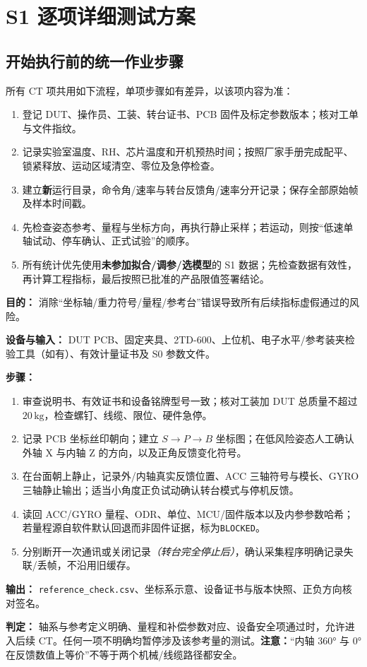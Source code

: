 \section{S1 逐项详细测试方案}
\subsection{开始执行前的统一作业步骤}
所有 CT 项共用如下流程，单项步骤如有差异，以该项内容为准：
\begin{enumerate}
\item 登记 DUT、操作员、工装、转台证书、PCB 固件及标定参数版本；核对工单与文件指纹。
\item 记录实验室温度、RH、芯片温度和开机预热时间；按照厂家手册完成配平、锁紧释放、运动区域清空、零位及急停检查。
\item 建立\textbf{新}运行目录，命令角/速率与转台反馈角/速率分开记录；保存全部原始帧及样本时间戳。
\item 先检查姿态参考、量程与坐标方向，再执行静止采样；若运动，则按“低速单轴试动、停车确认、正式试验”的顺序。
\item 所有统计优先使用\textbf{未参加拟合/调参/选模型}的 S1 数据；先检查数据有效性，再计算工程指标，最后按照已批准的产品限值签署结论。
\end{enumerate}

\textbf{目的：} 消除“坐标轴/重力符号/量程/参考台”错误导致所有后续指标虚假通过的风险。
\par\textbf{设备与输入：} DUT PCB、固定夹具、2TD-600、上位机、电子水平/参考装夹检验工具（如有）、有效计量证书及 S0 参数文件。
\par\textbf{步骤：}
\begin{enumerate}
\item 审查说明书、有效证书和设备铭牌型号一致；核对工装加 DUT 总质量不超过 $20\,\mathrm{kg}$，检查螺钉、线缆、限位、硬件急停。
\item 记录 PCB 坐标丝印朝向；建立 $S\rightarrow P\rightarrow B$ 坐标图；在低风险姿态人工确认外轴 X 与内轴 Z 的方向，以及正角反馈变化符号。
\item 在台面朝上静止，记录外/内轴真实反馈位置、ACC 三轴符号与模长、GYRO 三轴静止输出；适当小角度正负试动确认转台模式与停机反馈。
\item 读回 ACC/GYRO 量程、ODR、单位、MCU/固件版本以及内参参数哈希；若量程源自软件默认回退而非固件证据，标为\texttt{BLOCKED}。
\item 分别断开一次通讯或关闭记录\emph{（转台完全停止后）}，确认采集程序明确记录失联/丢帧，不沿用旧缓存。
\end{enumerate}
\textbf{输出：} \texttt{reference\_check.csv}、坐标系示意、设备证书与版本快照、正负方向核对签名。
\par\textbf{判定：} 轴系与参考定义明确、量程和补偿参数对应、设备安全项通过时，允许进入后续 CT。任何一项不明确均暂停涉及该参考量的测试。\textbf{注意：}“内轴 360° 与 0° 在反馈数值上等价”不等于两个机械/线缆路径都安全。

